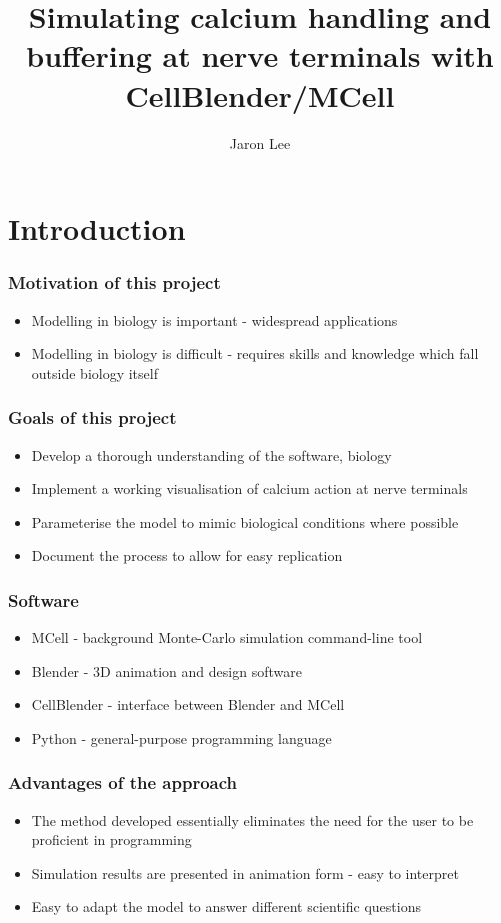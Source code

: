 \documentclass{beamer}
\begin{document}
\begin{frame}
\title{\textbf{Simulating calcium handling and buffering at nerve terminals with CellBlender/MCell}}
\author{Jaron Lee}
\maketitle
\end{frame}

\section{Introduction}
\frame
{
    \frametitle{Motivation of this project}
    \begin{itemize}
        \item Modelling in biology is important - widespread applications
        \item Modelling in biology is difficult - requires skills and knowledge which fall outside biology itself
    \end{itemize}
}

\frame
{
    \frametitle{Goals of this project}
    \begin{itemize}
        \item Develop a thorough understanding of the software, biology
        \item Implement a working visualisation of calcium action at nerve terminals 
        \item Parameterise the model to mimic biological conditions where possible 
        \item Document the process to allow for easy replication 
    \end{itemize}
}
\frame
{
    \frametitle{Software}
    \begin{itemize}
        \item MCell - background Monte-Carlo simulation command-line tool
        \item Blender - 3D animation and design software
        \item CellBlender - interface between Blender and MCell
        \item Python - general-purpose programming language
    \end{itemize}
}


\frame
{
    \frametitle{Advantages of the approach}
    \begin{itemize}
        \item The method developed essentially eliminates the need for the user to be proficient in programming 
        \item Simulation results are presented in animation form - easy to interpret
        \item Easy to adapt the model to answer different scientific questions
    \end{itemize}
}
\end{document}

